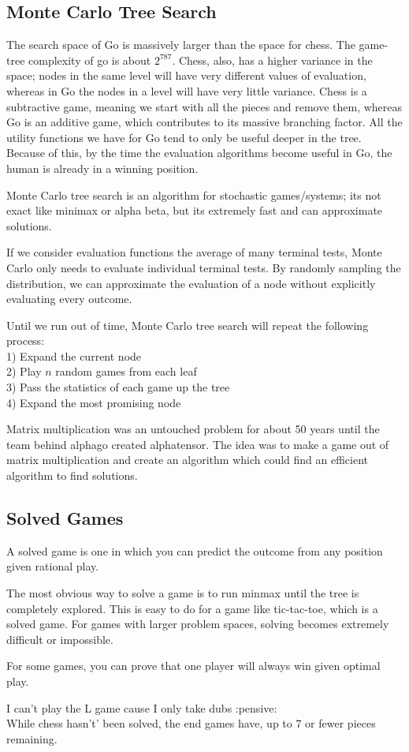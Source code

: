 \documentclass{chezarticle}
\begin{document}
\subsection{Monte Carlo Tree Search}
The search space of Go is massively larger than the space for chess. The game-tree complexity of go is about $2^787$. Chess, also, has a higher variance in the space; nodes in the same level will have very different values of evaluation, whereas in Go the nodes in a level will have very little variance. Chess is a subtractive game, meaning we start with all the pieces and remove them, whereas Go is an additive game, which contributes to its massive branching factor. All the utility functions we have for Go tend to only be useful deeper in the tree. Because of this, by the time the evaluation algorithms become useful in Go, the human is already in a winning position. 
\begin{proposition}
Monte Carlo tree search is an algorithm for stochastic games/systems; its not exact like minimax or alpha beta, but its extremely fast and can approximate solutions.
\end{proposition}
If we consider evaluation functions the average of many terminal tests, Monte Carlo only needs to evaluate individual terminal tests. By randomly sampling the distribution, we can approximate the evaluation of a node without explicitly evaluating every outcome. 
\begin{algorithm}
Until we run out of time, Monte Carlo tree search will repeat the following process:\\
1) Expand the current node\\
2) Play $n$ random games from each leaf\\
3) Pass the statistics of each game up the tree\\
4) Expand the most promising node
\end{algorithm}
\begin{fact}
Matrix multiplication was an untouched problem for about 50 years until the team behind alphago created alphatensor. The idea was to make a game out of matrix multiplication and create an algorithm which could find an efficient algorithm to find solutions.
\end{fact}
\subsection{Solved Games}
\begin{definition}
A solved game is one in which you can predict the outcome from any position given rational play.
\end{definition}
The most obvious way to solve a game is to run minmax until the tree is completely explored. This is easy to do for a game like tic-tac-toe, which is a solved game. For games with larger problem spaces, solving becomes extremely difficult or impossible.
\begin{fact}
For some games, you can prove that one player will always win given optimal play.
\end{fact}
I can't play the L game cause I only take dubs :pensive:\\
While chess hasn't' been solved, the end games have, up to 7 or fewer pieces remaining. 
\end{document}
